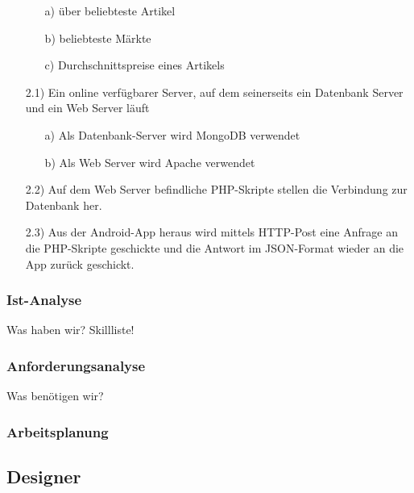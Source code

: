 \documentclass[12pt,a4paper]{article}
\begin{document}
\begin{itemize}
 \begin{itemize}
\item[a)]über beliebteste Artikel
\item[b)] beliebteste Märkte
\item[c)] Durchschnittspreise eines Artikels
\end{itemize}
 \item[2.1)] Ein online verfügbarer Server, auf dem seinerseits ein Datenbank Server und ein Web Server läuft
 \begin{itemize}
\item[a)]Als Datenbank-Server wird MongoDB verwendet
\item[b)]Als Web Server wird Apache verwendet
\end{itemize}
\item[2.2)] Auf dem Web Server befindliche PHP-Skripte stellen die Verbindung zur Datenbank her.
\item[2.3)] Aus der Android-App heraus wird mittels HTTP-Post eine Anfrage an die PHP-Skripte geschickte und die Antwort im JSON-Format wieder an die App zurück geschickt.
\end{itemize}
\newpage

\subsubsection{Ist-Analyse}
Was haben wir? Skillliste!
\newpage

\subsubsection{Anforderungsanalyse}
Was benötigen wir? 
\newpage

\subsubsection{Arbeitsplanung}
\subsection{Designer}
\end{document}
